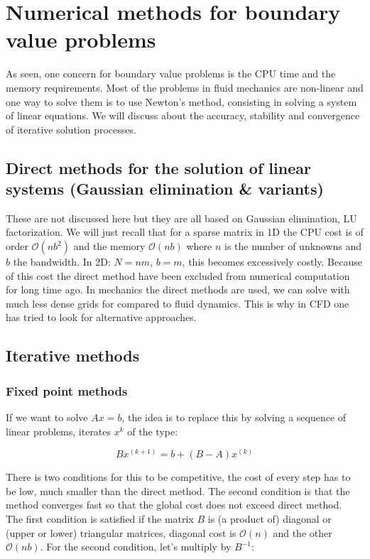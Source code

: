 
\chapter{Numerical methods for boundary value problems}
As seen, one concern for boundary value problems is the CPU time and the memory requirements. Most of the problems in fluid mechanics are non-linear and one way to solve them is to use Newton's method, consisting in solving a system of linear equations. We will discuss about the accuracy, stability and convergence of iterative solution processes. 

\section{Direct methods for the solution of linear systems (Gaussian elimination \& variants)}
These are not discussed here but they are all based on Gaussian elimination, LU factorization. We will just recall that for a sparse matrix in 1D the CPU cost is of order $\mathcal{O}(nb^2)$ and the memory $\mathcal{O}(nb)$ where $n$ is the number of unknowns and $b$ the bandwidth. In 2D: $N=nm$, $b=m$, this becomes excessively costly. Because of this cost the direct method have been excluded from numerical computation for long time ago. In mechanics the direct methods are used, we can solve with much less dense grids for compared to fluid dynamics. This is why in CFD one has tried to look for alternative approaches. 

\section{Iterative methods}
\subsection{Fixed point methods}
If we want to solve $Ax=b$, the idea is to replace this by solving a sequence of linear problems, iterates $x^k$ of the type: 

\begin{equation}
Bx^{(k+1)} = b + (B-A)x^{(k)}
\end{equation}

There is two conditions for this to be competitive, the cost of every step has to be low, much smaller than the direct method. The second condition is that the method converges fast so that the global cost does not exceed direct method.\\

The first condition is satisfied if the matrix $B$ is (a product of) diagonal or (upper or lower) triangular matrices, diagonal cost is $\mathcal{O}(n)$ and the other $\mathcal{O}(nb)$. For the second condition, let's multiply by $B^{-1}$:

